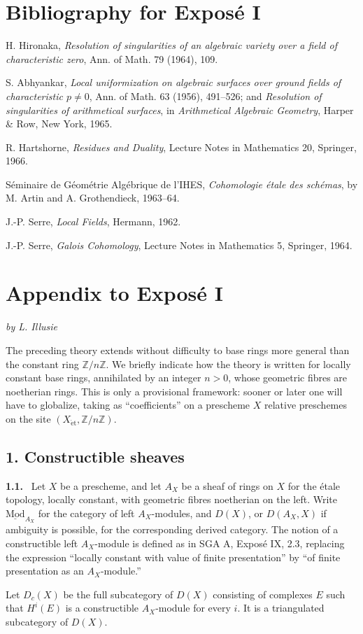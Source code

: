 \documentclass[12pt]{article}
\newcommand{\ZZ}{\mathbb Z}
\newenvironment{statement}[1]{\par\medskip\noindent\textbf{#1.}\ }{\par\medskip}
\begin{document}
\section*{Bibliography for Exposé I}
\begin{enumerate}[label={[\arabic*]}]
\item H. Hironaka, \emph{Resolution of singularities of an algebraic variety over a field of characteristic zero}, Ann. of Math. 79 (1964), 109.
\item S. Abhyankar, \emph{Local uniformization on algebraic surfaces over ground fields of characteristic $p\ne0$}, Ann. of Math. 63 (1956), 491--526; and \emph{Resolution of singularities of arithmetical surfaces}, in \emph{Arithmetical Algebraic Geometry}, Harper \& Row, New York, 1965.
\item R. Hartshorne, \emph{Residues and Duality}, Lecture Notes in Mathematics 20, Springer, 1966.
\item[SGA A] Séminaire de Géométrie Algébrique de l'IHES, \emph{Cohomologie étale des schémas}, by M. Artin and A. Grothendieck, 1963--64.
\item[CL] J.-P. Serre, \emph{Local Fields}, Hermann, 1962.
\item[CG] J.-P. Serre, \emph{Galois Cohomology}, Lecture Notes in Mathematics 5, Springer, 1964.
\end{enumerate}

\section*{Appendix to Exposé I}
\emph{by L. Illusie}

The preceding theory extends without difficulty to base rings more general than the constant ring $\ZZ/n\ZZ$. We briefly indicate how the theory is written for locally constant base rings, annihilated by an integer $n>0$, whose geometric fibres are noetherian rings. This is only a provisional framework: sooner or later one will have to globalize, taking as ``coefficients'' on a prescheme $X$ relative preschemes on the site $(X_{\mathrm{\acute et}},\ZZ/n\ZZ)$.

\subsection*{1. Constructible sheaves}

\begin{statement}{1.1}
Let $X$ be a prescheme, and let $A_X$ be a sheaf of rings on $X$ for the étale topology, locally constant, with geometric fibres noetherian on the left. Write $\underline{\mathrm{Mod}}_{A_X}$ for the category of left $A_X$-modules, and $D(X)$, or $D(A_X,X)$ if ambiguity is possible, for the corresponding derived category. The notion of a constructible left $A_X$-module is defined as in SGA A, Exposé IX, 2.3, replacing the expression ``locally constant with value of finite presentation'' by ``of finite presentation as an $A_X$-module.''

Let $D_c(X)$ be the full subcategory of $D(X)$ consisting of complexes $E$ such that $H^i(E)$ is a constructible $A_X$-module for every $i$. It is a triangulated subcategory of $D(X)$.
\end{statement}
\end{document}
